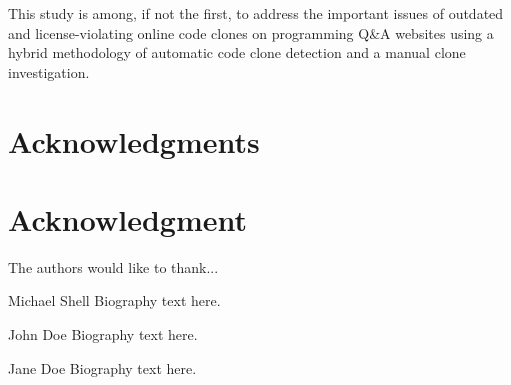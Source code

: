 \documentclass[10pt,journal,compsoc]{IEEEtran}
\begin{document}
This study is among, if not the first, to address the important issues
of outdated and license-violating online code clones on programming
Q\&A websites using a hybrid methodology of automatic code clone
detection and a manual clone investigation.


\ifCLASSOPTIONcompsoc
  \section*{Acknowledgments}
\else
  \section*{Acknowledgment}
\fi


The authors would like to thank...



  

% 

\begin{IEEEbiography}{Michael Shell}
Biography text here.
\end{IEEEbiography}

\begin{IEEEbiographynophoto}{John Doe}
Biography text here.
\end{IEEEbiographynophoto}


\begin{IEEEbiographynophoto}{Jane Doe}
Biography text here.
\end{IEEEbiographynophoto}






\end{document}
